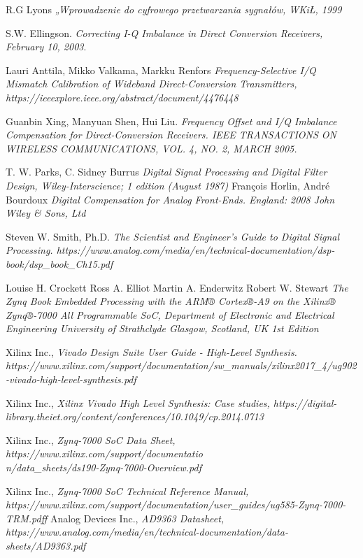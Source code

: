 \documentclass[en,printmode]{mgr}
\begin{document}
\begin{thebibliography}{9}
R.G Lyons
\textit{„Wprowadzenie do cyfrowego przetwarzania sygnałów, WKiŁ, 1999}

S.W. Ellingson. 
\textit{Correcting I-Q Imbalance in Direct Conversion
Receivers, February 10, 2003}.

Lauri Anttila,
Mikko Valkama,
Markku Renfors
\textit{Frequency-Selective I/Q Mismatch Calibration of Wideband Direct-Conversion Transmitters, https://ieeexplore.ieee.org/abstract/document/4476448}

Guanbin Xing, Manyuan Shen, Hui Liu.
\textit{Frequency Offset and I/Q Imbalance Compensation for Direct-Conversion Receivers. IEEE TRANSACTIONS ON WIRELESS COMMUNICATIONS, VOL. 4, NO. 2, MARCH 2005.}

T. W. Parks,
C. Sidney Burrus
\textit{Digital Signal Processing and
Digital Filter Design, Wiley-Interscience; 1 edition (August 1987)}
François Horlin, André Bourdoux
\textit{Digital Compensation for
Analog Front-Ends. England: 2008 John Wiley & Sons, Ltd}


Steven W. Smith, Ph.D.
\textit{The Scientist and Engineer's Guide to
Digital Signal Processing. https://www.analog.com/media/en/technical-documentation/dsp-book/dsp_book_Ch15.pdf}

Louise H. Crockett
Ross A. Elliot
Martin A. Enderwitz
Robert W. Stewart
\textit{The Zynq Book Embedded Processing with the ARM® Cortex®-A9 on the Xilinx®
Zynq®-7000 All Programmable SoC, Department of Electronic and Electrical Engineering
University of Strathclyde
Glasgow, Scotland, UK
1st Edition}

Xilinx Inc.,
\textit{Vivado Design Suite User Guide - High-Level Synthesis. https://www.xilinx.com/support/documentation/sw_manuals/xilinx2017_4/ug902-vivado-high-level-synthesis.pdf}

Xilinx Inc.,
\textit{Xilinx Vivado High Level Synthesis: Case studies, https://digital-library.theiet.org/content/conferences/10.1049/cp.2014.0713}

Xilinx Inc.,
\textit{Zynq-7000 SoC Data Sheet, https://www.xilinx.com/support/documentatio \\
n/data_sheets/ds190-Zynq-7000-Overview.pdf}

Xilinx Inc.,
\textit{Zynq-7000 SoC Technical Reference Manual, https://www.xilinx.com/support/documentation/user_guides/ug585-Zynq-7000-TRM.pdff}
Analog Devices Inc.,
\textit{AD9363 Datasheet, https://www.analog.com/media/en/technical-documentation/data-sheets/AD9363.pdf}


\end{thebibliography}
\end{document}
